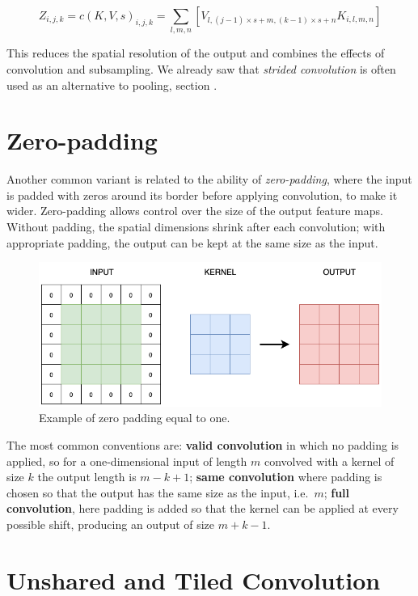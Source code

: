 \begin{equation}
    Z_{i,j,k}=c(K,V,s)_{i,j,k}=\sum_{l,m,n}[V_{l,(j-1)\times s+m,(k-1)\times s+n}K_{i,l,m,n}]
\end{equation}
 
\clearpage

This reduces the spatial resolution of the output and combines the effects of convolution and subsampling. We already saw that \textit{strided convolution} is often used as an alternative to pooling, section .  

\section{Zero-padding}

Another common variant is related to the ability of \textit{zero-padding}, where the input is padded with zeros around its border before applying convolution, to make it wider. Zero-padding allows control over the size of the output feature maps.  
Without padding, the spatial dimensions shrink after each convolution; with appropriate padding, the output can be kept at the same size as the input.

\begin{figure} [H]
    \centering
    \includegraphics[width=0.7\linewidth]{Images//Chapters/zero_padding.png}
    \caption{Example of zero padding equal to one.}
    \label{fig:zero_padding}
\end{figure}

The most common conventions are: \textbf{valid convolution} in which no padding is applied, so for a one-dimensional input of length $m$ convolved with a kernel of size $k$ the output length is $m - k + 1$; \textbf{same convolution} where padding is chosen so that the output has the same size as the input, i.e.\ $m$; \textbf{full convolution}, here padding is added so that the kernel can be applied at every possible shift, producing an output of size $m + k - 1$.  

\section{Unshared and Tiled Convolution}

